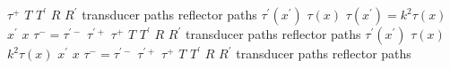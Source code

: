\documentclass[10pt]{/home/tom/thesis/mythesis}
\begin{document}
\mpxshipout%
$\tau^{+}$\stopmpxshipout
\mpxshipout%
$T$\stopmpxshipout
\mpxshipout%
$T^\prime$\stopmpxshipout
\mpxshipout%
$R$\stopmpxshipout
\mpxshipout%
$R^\prime$\stopmpxshipout
\mpxshipout%
transducer paths\stopmpxshipout
\mpxshipout%
reflector paths\stopmpxshipout
\mpxshipout%
$\tau^\prime(x^\prime)$\stopmpxshipout
\mpxshipout%
$\tau(x)$\stopmpxshipout
\mpxshipout%
$\tau(x^\prime) = k^2\tau(x)$\stopmpxshipout
\mpxshipout%
$x^\prime$\stopmpxshipout
\mpxshipout%
$x$\stopmpxshipout
\mpxshipout%
$\tau^{-} = \tau^{\prime-}$\stopmpxshipout
\mpxshipout%
$\tau^{\prime+}$\stopmpxshipout
\mpxshipout%
$\tau^{+}$\stopmpxshipout
\mpxshipout%
$T$\stopmpxshipout
\mpxshipout%
$T^\prime$\stopmpxshipout
\mpxshipout%
$R$\stopmpxshipout
\mpxshipout%
$R^\prime$\stopmpxshipout
\mpxshipout%
transducer paths\stopmpxshipout
\mpxshipout%
reflector paths\stopmpxshipout
\mpxshipout%
$\tau^\prime(x^\prime)$\stopmpxshipout
\mpxshipout%
$\tau(x)$\stopmpxshipout
\mpxshipout%
$k^2\tau(x)$\stopmpxshipout
\mpxshipout%
$x^\prime$\stopmpxshipout
\mpxshipout%
$x$\stopmpxshipout
\mpxshipout%
$\tau^{-} = \tau^{\prime-}$\stopmpxshipout
\mpxshipout%
$\tau^{\prime+}$\stopmpxshipout
\mpxshipout%
$\tau^{+}$\stopmpxshipout
\mpxshipout%
$T$\stopmpxshipout
\mpxshipout%
$T^\prime$\stopmpxshipout
\mpxshipout%
$R$\stopmpxshipout
\mpxshipout%
$R^\prime$\stopmpxshipout
\mpxshipout%
transducer paths\stopmpxshipout
\mpxshipout%
reflector paths\stopmpxshipout
\end{document}
